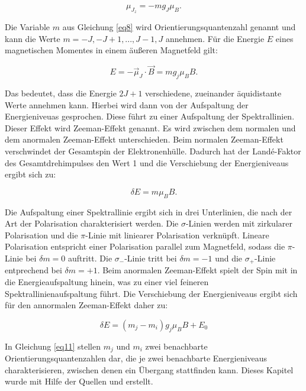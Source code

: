 \begin{equation}
    \mu_{J_z} = -m g_J \mu_B.
    \label{eq8}
\end{equation}

Die Variable $m$ aus Gleichung \ref{eq8} wird Orientierungsquantenzahl genannt und kann
die Werte $m = -J, -J+1, ... , J-1,J$ annehmen. Für die Energie $E$ eines 
magnetischen Momentes in einem äußeren Magnetfeld gilt:

\begin{equation}
    E = - \vec{\mu}_J \cdot \vec{B} = m g_j \mu_B B.
    \label{eq9}
\end{equation}

Das bedeutet, dass die Energie $2J+1$ verschiedene, zueinander 
äquidistante Werte annehmen kann. 
Hierbei wird dann von der Aufspaltung der Energieniveuas gesprochen. 
Diese führt zu einer Aufspaltung der Spektrallinien.
Dieser Effekt wird Zeeman-Effekt genannt.
Es wird zwischen dem normalen und dem anormalen Zeeman-Effekt unterschieden.
Beim normalen Zeeman-Effekt verschwindet der Gesamtspin der Elektronenhülle.
Dadurch hat der Landé-Faktor des Gesamtdrehimpulses den Wert 1 und 
die Verschiebung der Energieniveaus ergibt sich zu:

\begin{equation}
    \delta E = m \mu_B B.
    \label{eq10}
\end{equation}

Die Aufspaltung einer Spektrallinie ergibt sich in drei Unterlinien,
die nach der Art der Polarisation charakterisiert werden. 
Die $\sigma$-Linien werden mit zirkularer Polarisation und die $\pi$-Linie 
mit liniearer Polarisation verknüpft. Lineare Polarisation entspricht einer Polarisation
parallel zum Magnetfeld, sodass die $\pi$-Linie bei $\delta m = 0$ auftritt.
Die $\sigma_-$-Linie tritt bei $\delta m = -1$ und die $\sigma_+$-Linie entprechend 
bei $\delta m = +1$.
Beim anormalen Zeeman-Effekt spielt der Spin mit in die Energieaufspaltung hinein, 
was zu einer viel feineren Spektrallinienaufspaltung führt. 
Die Verschiebung der Energieniveaus ergibt sich für den annormalen Zeeman-Effekt 
daher zu:

\begin{equation}
    \delta E = (m_j -m_i)g_j \mu_B B + E_0
    \label{eq11}
\end{equation}

In Gleichung \eqref{eq11} stellen $m_j$ und $m_i$ zwei benachbarte Orientierungsquantenzahlen
dar, die je zwei benachbarte Energieniveaus charakterisieren, zwischen denen ein Übergang 
stattfinden kann. Dieses Kapitel wurde mit Hilfe der 
Quellen \cite{dem1} und \cite{dem3} erstellt.